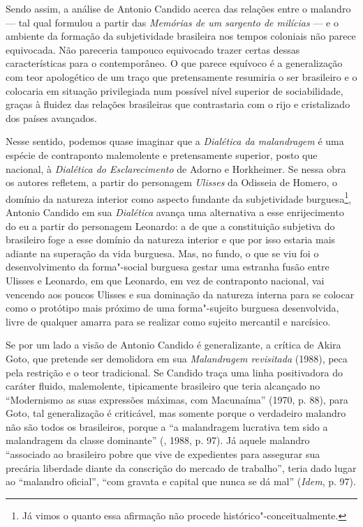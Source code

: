 Sendo assim, a análise de Antonio Candido acerca das relações entre o
malandro --- tal qual formulou a partir das \emph{Memórias de um sargento
de milícias} --- e o ambiente da formação da subjetividade brasileira nos
tempos coloniais não parece equivocada. Não pareceria tampouco
equivocado trazer certas dessas características para o contemporâneo. O
que parece equívoco é a generalização com teor apologético de um traço
que pretensamente resumiria o ser brasileiro e o colocaria em situação
privilegiada num possível nível superior de sociabilidade, graças à
fluidez das relações brasileiras que contrastaria com o rijo e
cristalizado dos países avançados.

Nesse sentido, podemos quase imaginar que a \emph{Dialética da
malandragem} é uma espécie de contraponto malemolente e pretensamente
superior, posto que nacional, à \emph{Dialética do Esclarecimento} de
Adorno e Horkheimer. Se nessa obra os autores refletem, a partir do
personagem \emph{Ulisses} da Odisseia de Homero, o domínio da natureza
interior como aspecto fundante da subjetividade burguesa\footnote{Já vimos
o quanto essa afirmação não procede histórico"-conceitualmente.}, Antonio
Candido em sua \emph{Dialética} avança uma alternativa a esse
enrijecimento do eu a partir do personagem Leonardo: a de que a
constituição subjetiva do brasileiro foge a esse domínio da natureza
interior e que por isso estaria mais adiante na superação da vida
burguesa. Mas, no fundo, o que se viu foi o desenvolvimento da
forma"-social burguesa gestar uma estranha fusão entre Ulisses e
Leonardo, em que Leonardo, em vez de contraponto nacional, vai vencendo
aos poucos Ulisses e sua dominação da natureza interna para se colocar
como o protótipo mais próximo de uma forma"-sujeito burguesa
desenvolvida, livre de qualquer amarra para se realizar como sujeito
mercantil e narcísico.

Se por um lado a visão de Antonio Candido é generalizante, a crítica de
Akira Goto, que pretende ser demolidora em sua \emph{Malandragem
revisitada} (1988), peca pela restrição e o teor tradicional. Se Candido
traça uma linha positivadora do caráter fluido, malemolente, tipicamente
brasileiro que teria alcançado no ``Modernismo as suas expressões
máximas, com Macunaíma'' (1970, p. 88), para Goto, tal generalização é
criticável, mas somente porque o verdadeiro malandro não são todos os
brasileiros, porque a ``a malandragem lucrativa tem sido a malandragem
da classe dominante'' (, 1988, p. 97). Já aquele malandro
``associado ao brasileiro pobre que vive de expedientes para assegurar
sua precária liberdade diante da conscrição do mercado de trabalho'',
teria dado lugar ao ``malandro oficial'', ``com gravata e capital que
nunca se dá mal'' (\emph{Idem}, p. 97).


